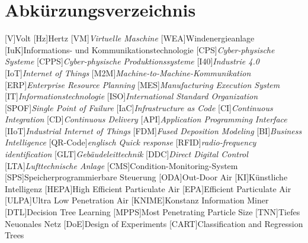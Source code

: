 \chapter{Abkürzungsverzeichnis}
    
\begin{acronym}
    [V]{Volt}
    [Hz]{Hertz}
    [VM]{\textit{Virtuelle Maschine}}
    [WEA]{Windenergieanlage}
    [IuK]{Informations- und Kommunikationstechnologie}
    [CPS]{\textit{Cyber-physische Systeme}}
    [CPPS]{\textit{Cyber-physische Produktionssysteme}}
    [I40]{\textit{Industrie 4.0}}
    [IoT]{\textit{Internet of Things}}
    [M2M]{\textit{Machine-to-Machine-Kommunikation}}
    [ERP]{\textit{Enterprise Resource Planning}}
    [MES]{\textit{Manufacturing Execution System}}
    [IT]{\textit{Informationstechnologie}}
    [ISO]{\textit{International Standard Organization}}
    [SPOF]{\textit{Single Point of Failure}}
    [IaC]{\textit{Infrastructure as Code}}
    [CI]{\textit{Continuous Integration}}
    [CD]{\textit{Continuous Delivery}}
    [API]{\textit{Application Programming Interface}}
    [IIoT]{\textit{Industrial Internet of Things}}
    [FDM]{\textit{Fused Deposition Modeling}}
    [BI]{\textit{Business Intelligence}}
    [QR-Code]{\textit{englisch Quick response}}
    [RFID]{\textit{radio-frequency identification}}
    [GLT]{\textit{Gebäudeleittechnik}}
    [DDC]{\textit{Direct Digital Control}}
    [LTA]{\textit{Lufttechnische Anlage}}
    [CMS]{Condition-Monitoring-System}
    [SPS]{Speicherprogrammierbare Steuerung}
    [ODA]{Out-Door Air}
    [KI]{Künstliche Intelligenz}
    [HEPA]{High Efficient Particulate Air}
    [EPA]{Efficient Particulate Air}
    [ULPA]{Ultra Low Penetration Air}
    [KNIME]{Konstanz Information Miner}
    [DTL]{Decision Tree Learning}
    [MPPS]{Most Penetrating Particle Size}
    [TNN]{Tiefes Neuonales Netz}
    [DoE]{Design of Experiments}
    [CART]{Classification and Regression Trees}
    \cleardoublepage


\end{acronym}
